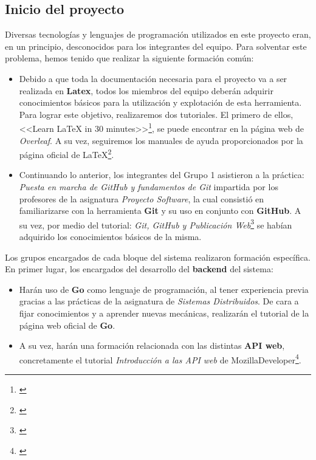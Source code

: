 \documentclass[11pt, a4paper, titlepage]{article}
\begin{document}
\subsection{Inicio del proyecto}

Diversas tecnologías y lenguajes de programación utilizados en este proyecto eran, en un principio, desconocidos para los integrantes del equipo. Para solventar este problema, hemos tenido que realizar la siguiente formación común:

\begin{itemize}

\item Debido a que toda la documentación necesaria para el proyecto va a ser realizada en \textbf{Latex}, todos los miembros del equipo deberán adquirir conocimientos básicos para la utilización y explotación de esta herramienta. Para lograr este objetivo, realizaremos dos tutoriales. El primero de ellos, <<Learn LaTeX in 30 minutes>>\footnote{\href{https://www.overleaf.com/learn/latex/Learn_LaTeX_in_30_minutes}{\color{blue}{Learn LaTeX in 30 minutes}}}, se puede encontrar en la página web de \textit{Overleaf}. A su vez, seguiremos los manuales de ayuda proporcionados por la página oficial de \LaTeX \footnote{\href{https://latex-tutorial.com/tutorials/}{\color{blue}{Tutorial oficial de \LaTeX}}}.



\item Continuando lo anterior, los integrantes del Grupo 1 asistieron a la práctica: \textit{Puesta en marcha de GitHub y fundamentos de Git} impartida por los profesores de la asignatura \textit{Proyecto Software}, la cual consistió en familiarizarse con la herramienta \textbf{Git} y su uso en conjunto con \textbf{GitHub}. A su vez, por medio del tutorial: \textit{Git, GitHub y Publicación Web}\footnote{\href{https://github.com/flowsta/github}{\color{blue}{Git, GitHub y Publicación Web}}} se habían adquirido los conocimientos básicos de la misma.

\end{itemize}

Los grupos encargados de cada bloque del sistema realizaron formación específica. En primer lugar, los encargados del desarrollo del \textbf{backend} del sistema:

\begin{itemize}

\item Harán uso de \textbf{Go} como lenguaje de programación, al tener experiencia previa gracias a las prácticas de la asignatura de \textit{Sistemas Distribuidos}. De cara a fijar conocimientos y a aprender nuevas mecánicas, realizarán el tutorial de la página web oficial de \textbf{Go}.

\item A su vez, harán una formación relacionada con las distintas \textbf{API web}, concretamente el tutorial \textit{Introducción a las API web} de MozillaDeveloper\footnote{\href{https://developer.mozilla.org/es/docs/Learn/JavaScript/Client-side_web_APIs/Introduction}{\color{blue}{Introducción a las API web}}}.

\end{itemize}
\end{document}
